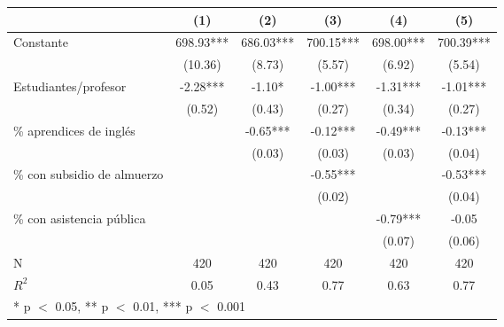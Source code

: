 \begin{tabular}[t]{lccccc}
\toprule
  & (1) & (2) & (3) & (4) & (5)\\
\midrule
Constante & 698.93*** & 686.03*** & 700.15*** & 698.00*** & 700.39***\\
 & (10.36) & (8.73) & (5.57) & (6.92) & (5.54)\\
Estudiantes/profesor & -2.28*** & -1.10* & -1.00*** & -1.31*** & -1.01***\\
 & (0.52) & (0.43) & (0.27) & (0.34) & (0.27)\\
\% aprendices de inglés &  & -0.65*** & -0.12*** & -0.49*** & -0.13***\\
 &  & (0.03) & (0.03) & (0.03) & (0.04)\\
\% con subsidio de almuerzo &  &  & -0.55*** &  & -0.53***\\
 &  &  & (0.02) &  & (0.04)\\
\% con asistencia pública &  &  &  & -0.79*** & -0.05\\
 &  &  &  & (0.07) & (0.06)\\
\midrule
N & 420 & 420 & 420 & 420 & 420\\
$R^2$ & 0.05 & 0.43 & 0.77 & 0.63 & 0.77\\
\bottomrule
\multicolumn{6}{l}{\rule{0pt}{1em}* p $<$ 0.05, ** p $<$ 0.01, *** p $<$ 0.001}\\
\end{tabular}
